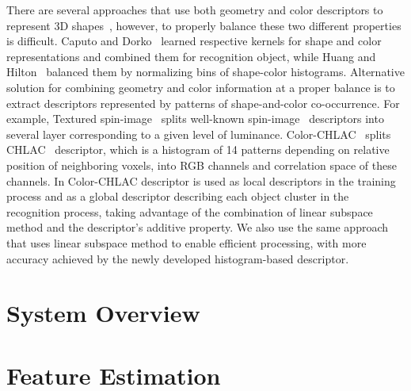 \documentclass[conference]{sty/IEEEtran}
\begin{document}
There are several approaches that use both geometry and color descriptors to
represent 3D shapes~\cite{park2006}, however, to properly balance these two
different properties is difficult.  Caputo and Dorko~\cite{caputo2002} learned
respective kernels for shape and color representations and combined them for
recognition object, while Huang and Hilton~\cite{huang2009} balanced them by
normalizing bins of shape-color histograms.  Alternative solution for combining
geometry and color information at a proper balance is to extract descriptors
represented by patterns of shape-and-color co-occurrence.  For example, Textured
spin-image~\cite{cortelazzo2006} splits well-known
spin-image~\cite{Johnson_spin_images} descriptors into several layer
corresponding to a given level of luminance. Color-CHLAC~\cite{kanezaki2010icra} 
splits CHLAC~\cite{kobayashi2004} descriptor, which is a histogram of 14 patterns 
depending on relative position of neighboring voxels, into RGB channels and correlation 
space of these channels.  In \cite{kanezaki2010icra} Color-CHLAC descriptor is used as local
descriptors in the training process and as a global descriptor describing each
object cluster in the recognition process, taking advantage of the combination
of linear subspace method and the descriptor's additive property.  We also use
the same approach that uses linear subspace method to enable efficient
processing, with more accuracy achieved by the newly developed histogram-based
descriptor.

\section{System Overview}
\label{sec:overview}

\section{Feature Estimation}
\label{sec:features}
\end{document}
